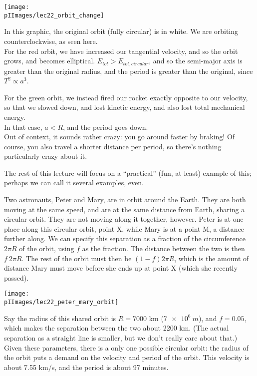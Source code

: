 \begin{center}
\texttt{[image: \\pIImages/lec22\_orbit\_change]}
\end{center}

In this graphic, the original orbit (fully circular) is in white. We are orbiting counterclockwise, as seen here.\\
For the red orbit, we have increased our tangential velocity, and so the orbit grows, and becomes elliptical. $E_{tot} > E_{tot,circular}$, and so the semi-major axis is greater than the original radius, and the period is greater than the original, since $T^2 \propto a^3$.

For the green orbit, we instead fired our rocket exactly opposite to our velocity, so that we slowed down, and lost kinetic energy, and also lost total mechanical energy.\\
In that case, $a < R$, and the period goes down.\\
Out of context, it sounds rather crazy: you go around faster by braking! Of course, you also travel a shorter distance per period, so there's nothing particularly crazy about it.

The rest of this lecture will focus on a ``practical'' (fun, at least) example of this; perhaps we can call it several examples, even.

Two astronauts, Peter and Mary, are in orbit around the Earth. They are both moving at the same speed, and are at the same distance from Earth, sharing a circular orbit. They are not moving along it together, however. Peter is at one place along this circular orbit, point X, while Mary is at a point M, a distance further along. We can specify this separation as a fraction of the circumference $2 \pi R$ of the orbit, using $f$ as the fraction. The distance between the two is then $f\ 2 \pi R$. The rest of the orbit must then be $(1-f) 2 \pi R$, which is the amount of distance Mary must move before she ends up at point X (which she recently passed).

\begin{center}
\texttt{[image: \\pIImages/lec22\_peter\_mary\_orbit]}
\end{center}

Say the radius of this shared orbit is $R = 7000$ km ($\SI{7e6}{m}$), and $f = 0.05$, which makes the separation between the two about 2200 km. (The actual separation as a straight line is smaller, but we don't really care about that.)\\
Given these parameters, there is a only one possible circular orbit: the radius of the orbit puts a demand on the velocity and period of the orbit. This velocity is about 7.55 km/s, and the period is about 97 minutes.

